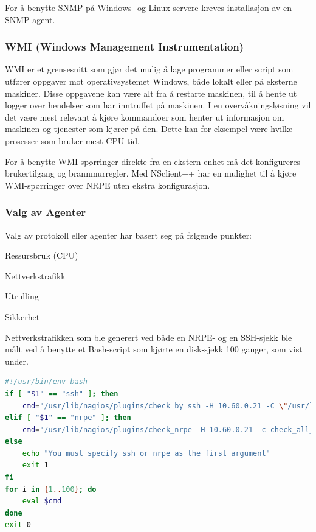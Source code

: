 For å benytte SNMP på Windows- og Linux-servere kreves installasjon av en SNMP-agent\cite{mssnmp,netsnmp}.

\subsubsection{WMI (Windows Management Instrumentation)}
WMI er et grensesnitt som gjør det mulig å lage programmer eller script som utfører oppgaver mot operativsystemet Windows, både lokalt eller på eksterne maskiner. Disse oppgavene kan være alt fra å restarte maskinen, til å hente ut logger over hendelser som har inntruffet på maskinen. I en overvåkningsløsning vil det være mest relevant å kjøre kommandoer som henter ut informasjon om maskinen og tjenester som kjører på den. Dette kan for eksempel være hvilke prosesser som bruker mest CPU-tid.

For å benytte WMI-spørringer direkte fra en ekstern enhet må det konfigureres brukertilgang og brannmurregler\cite{wmiremote}. Med NSclient++ har en mulighet til å kjøre WMI-spørringer over NRPE uten ekstra konfigurasjon.

\subsubsection{Valg av Agenter}
Valg av protokoll eller agenter har basert seg på følgende punkter:
\begin{itemize*}
	\item Ressursbruk (CPU)
	\item Nettverkstrafikk
	\item Utrulling
	\item Sikkerhet
\end{itemize*}
Nettverkstrafikken som ble generert ved både en NRPE- og en SSH-sjekk ble målt ved å benytte et Bash-script som kjørte en disk-sjekk 100 ganger, som vist under. 

\begin{lstlisting}[style=example,language=bash]
#!/usr/bin/env bash
if [ "$1" == "ssh" ]; then
    cmd="/usr/lib/nagios/plugins/check_by_ssh -H 10.60.0.21 -C \"/usr/lib/nagios/plugins/check_disk -W 10% -C 5% -M -A\" > /dev/null"
elif [ "$1" == "nrpe" ]; then
    cmd="/usr/lib/nagios/plugins/check_nrpe -H 10.60.0.21 -c check_all_mounts -a 10,5 > /dev/null"
else
    echo "You must specify ssh or nrpe as the first argument"
    exit 1
fi
for i in {1..100}; do
    eval $cmd
done
exit 0
\end{lstlisting}

